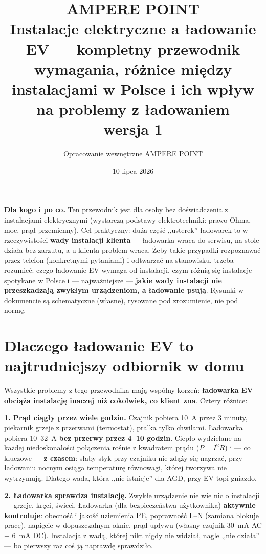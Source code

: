 \documentclass[11pt,a4paper]{article}
\title{\textbf{AMPERE POINT}\\[4pt]
\large Instalacje elektryczne a ładowanie EV --- kompletny przewodnik\\[2pt]
\normalsize wymagania, różnice między instalacjami w Polsce i ich wpływ na problemy z ładowaniem\\
wersja 1}
\author{Opracowanie wewnętrzne AMPERE POINT}
\date{10 lipca 2026}
\begin{document}
\maketitle
\vspace{-1.4em}

\noindent\textbf{Dla kogo i po co.} Ten przewodnik jest dla osoby bez doświadczenia z instalacjami
elektrycznymi (wystarczą podstawy elektrotechniki: prawo Ohma, moc, prąd przemienny). Cel praktyczny:
duża część ,,usterek'' ładowarek to w rzeczywistości \textbf{wady instalacji klienta} --- ładowarka
wraca do serwisu, na stole działa bez zarzutu, a u klienta problem wraca. Żeby takie przypadki
rozpoznawać przez telefon (konkretnymi pytaniami) i odtwarzać na stanowisku, trzeba rozumieć:
czego ładowanie EV wymaga od instalacji, czym różnią się instalacje spotykane w Polsce i ---
najważniejsze --- \textbf{jakie wady instalacji nie przeszkadzają zwykłym urządzeniom, a ładowanie
psują}. Rysunki w dokumencie są schematyczne (własne), rysowane pod zrozumienie, nie pod normę.

\tableofcontents

\section{Dlaczego ładowanie EV to najtrudniejszy odbiornik w domu}
\label{sec:dlaczego}
Wszystkie problemy z tego przewodnika mają wspólny korzeń: \textbf{ładowarka EV obciąża instalację
inaczej niż cokolwiek, co klient zna}. Cztery różnice:

\textbf{1. Prąd ciągły przez wiele godzin.} Czajnik pobiera 10~A przez 3 minuty, piekarnik grzeje
z przerwami (termostat), pralka tylko chwilami. Ładowarka pobiera 10--32~A \textbf{bez przerwy przez
4--10 godzin}. Ciepło wydzielane na każdej niedoskonałości połączenia rośnie z kwadratem prądu
($P=I^2R$) i --- co kluczowe --- \textbf{z czasem}: słaby styk przy czajniku nie zdąży się nagrzać,
przy ładowaniu nocnym osiąga temperaturę równowagi, której tworzywa nie wytrzymują. Dlatego wada,
która ,,nie istnieje'' dla AGD, przy EV topi gniazdo.

\textbf{2. Ładowarka sprawdza instalację.} Zwykłe urządzenie nie wie nic o instalacji --- grzeje,
kręci, świeci. Ładowarka (dla bezpieczeństwa użytkownika) \textbf{aktywnie kontroluje}: obecność
i jakość uziemienia PE, poprawność L--N (zamiana blokuje pracę), napięcie w dopuszczalnym oknie,
prąd upływu (własny czujnik 30~mA AC $+$ 6~mA DC). Instalacja z wadą, której nikt nigdy nie widział,
nagle ,,nie działa'' --- bo pierwszy raz coś ją naprawdę sprawdziło.
\end{document}
